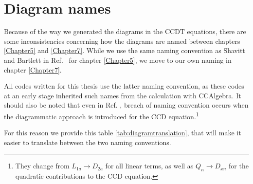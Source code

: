 
\chapter{Diagram names} %

\label{AppendixA} %


Because of the way we generated the diagrams in the CCDT equations, there are some inconsistencies concerning how the diagrams are named between chapters \ref{Chapter5} and \ref{Chapter7}. While we use the same naming convention as Shavitt and Bartlett in Ref.~\cite{ShavittBartlett2009} for chapter \ref{Chapter5}, we move to our own naming in chapter \ref{Chapter7}. 

All codes written for this thesis use the latter naming convention, as
these codes at an early stage inherited such names from the
calculation with CCAlgebra. It should also be noted that even in
Ref. \cite{ShavittBartlett2009}, breach of naming convention occurs
when the diagrammatic approach is introduced for the CCD
equation.\footnote{They change from $L_{1a} \rightarrow D_{2a}$ for
  all linear terms, as well as $Q_n \rightarrow D_{xn}$ for the
  quadratic contributions to the CCD equation.}

For this reason we provide this table \ref{tab:diagramtranslation},
that will make it easier to translate between the two naming
conventions.

